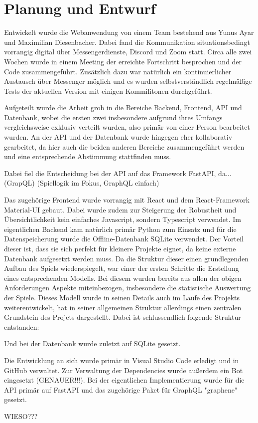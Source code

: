 \section{Planung und Entwurf}

Entwickelt wurde die Webanwendung von einem Team bestehend aus Yunus Ayar und Maximilian Diesenbacher. Dabei fand die Kommunikation situationsbedingt vorrangig digital über Messengerdienste, Discord und Zoom statt. Circa alle zwei Wochen wurde in einem Meeting der erreichte Fortschritt besprochen und der Code zusammengeführt. Zusätzlich dazu war natürlich ein kontinuierlicher Austausch über Messenger möglich und es wurden selbstverständlich regelmäßige Tests der aktuellen Version mit einigen Kommilitonen durchgeführt.

Aufgeteilt wurde die Arbeit grob in die Bereiche Backend, Frontend, API und Datenbank, wobei die ersten zwei insbesondere aufgrund ihres Umfangs vergleichsweise exklusiv verteilt wurden, also primär von einer Person bearbeitet wurden. An der API und der Datenbank wurde hingegen eher kollaborativ gearbeitet, da hier auch die beiden anderen Bereiche zusammengeführt werden und eine entsprechende Abstimmung stattfinden muss.

Dabei fiel die Entscheidung bei der API auf das Framework FastAPI, da...(GrapQL) (Spiellogik im Fokus, GraphQL einfach)

Das zugehörige Frontend wurde vorrangig mit React und dem React-Framework Material-UI gebaut. Dabei wurde zudem zur Steigerung der Robustheit und Übersichtlichkeit kein einfaches Javascript, sondern Typescript verwendet. Im eigentlichen Backend kam natürlich primär Python zum Einsatz und für die Datenspeicherung wurde die Offline-Datenbank SQLite verwendet. Der Vorteil dieser ist, dass sie sich perfekt für kleinere Projekte eignet, da keine externe Datenbank aufgesetzt werden muss. Da die Struktur dieser einen grundlegenden Aufbau des Spiels wiederspiegelt, war einer der ersten Schritte die Erstellung eines entsprechenden Modells. Bei diesem wurden bereits aus allen der obigen Anforderungen Aspekte miteinbezogen, insbesondere die statistische Auswertung der Spiele. Dieses Modell wurde in seinen Details auch im Laufe des Projekts weiterentwickelt, hat in seiner allgemeinen Struktur allerdings einen zentralen Grundstein des Projets dargestellt. Dabei ist schlussendlich folgende Struktur entstanden:

Und bei der Datenbank wurde zuletzt auf SQLite gesetzt. 

Die Entwicklung an sich wurde primär in Visual Studio Code erledigt und in GitHub verwaltet. Zur Verwaltung der Dependencies wurde außerdem ein Bot eingesetzt (GENAUER!!!). Bei der eigentlichen Implementierung wurde für die API primär auf FastAPI und das zugehörige Paket für GraphQL "graphene" gesetzt. 

WIESO??? 

